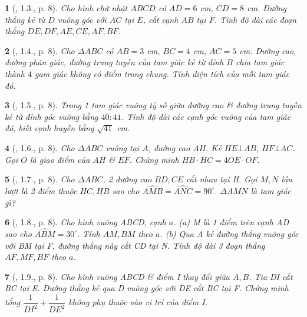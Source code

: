\documentclass{article}
\newtheorem{baitoan}{}
\begin{document}
\begin{baitoan}[\cite{TLCT_THCS_Toan_9_hinh_hoc}, 1.3., p. 8]
	Cho hình chữ nhật $ABCD$ có $AD = 6$ \emph{cm}, $CD = 8$ \emph{cm}. Đường thẳng kẻ từ $D$ vuông góc với $AC$ tại $E$, cắt cạnh $AB$ tại $F$. Tính độ dài các đoạn thẳng $DE,DF,AE,CE,AF,BF$.
\end{baitoan}

\begin{baitoan}[\cite{TLCT_THCS_Toan_9_hinh_hoc}, 1.4., p. 8]
	Cho $\Delta ABC$ có $AB = 3$  \emph{cm}, $BC = 4$ \emph{cm}, $AC = 5$ \emph{cm}. Đường cao, đường phân giác, đường trung tuyến của tam giác kẻ từ đỉnh $B$ chia tam giác thành $4$ gam giác không có điểm trong chung. Tính diện tích của mỗi tam giác đó.
\end{baitoan}

\begin{baitoan}[\cite{TLCT_THCS_Toan_9_hinh_hoc}, 1.5., p. 8]
	Trong 1 tam giác vuông tỷ số giữa đường cao \& đường trung tuyến kẻ từ đỉnh góc vuông bằng $40:41$. Tính độ dài các cạnh góc vuông của tam giác đó, biết cạnh huyền bằng $\sqrt{41}$ \emph{cm}.
\end{baitoan}

\begin{baitoan}[\cite{TLCT_THCS_Toan_9_hinh_hoc}, 1.6., p. 8]
	Cho $\Delta ABC$ vuông tại $A$, đường cao $AH$. Kẻ $HE\bot AB$, $HF\bot AC$. Gọi $O$ là giao điểm của $AH$ \& $EF$. Chứng minh $HB\cdot HC = 4OE\cdot OF$.
\end{baitoan}

\begin{baitoan}[\cite{TLCT_THCS_Toan_9_hinh_hoc}, 1.7., p. 8]
	Cho $\Delta ABC$, 2 đường cao $BD,CE$ cắt nhau tại H. Gọi $M,N$ lần lượt là 2 điểm thuộc $HC,HB$ sao cho $\widehat{AMB} = \widehat{ANC} = 90^\circ$. $\Delta AMN$ là tam giác gì?
\end{baitoan}

\begin{baitoan}[\cite{TLCT_THCS_Toan_9_hinh_hoc}, 1.8., p. 8]
	Cho hình vuông ABCD, cạnh $a$. (a) M là 1 điểm trên cạnh AD sao cho $\widehat{ABM} = 30^\circ$. Tính $AM,BM$ theo $a$. (b) Qua A kẻ đường thẳng vuông góc với BM tại F, đường thẳng này cắt CD tại N. Tính độ dài 3 đoạn thẳng $AF,MF,BF$ theo $a$.
\end{baitoan}

\begin{baitoan}[\cite{TLCT_THCS_Toan_9_hinh_hoc}, 1.9., p. 8]
	Cho hình vuông ABCD \& điểm I thay đổi giữa $A,B$. Tia DI cắt BC tại E. Đường thẳng kẻ qua D vuông góc với DE cắt BC tại F. Chứng minh tổng $\dfrac{1}{DI^2} + \dfrac{1}{DE^2}$ không phụ thuộc vào vị trí của điểm I.
\end{baitoan}
\end{document}
